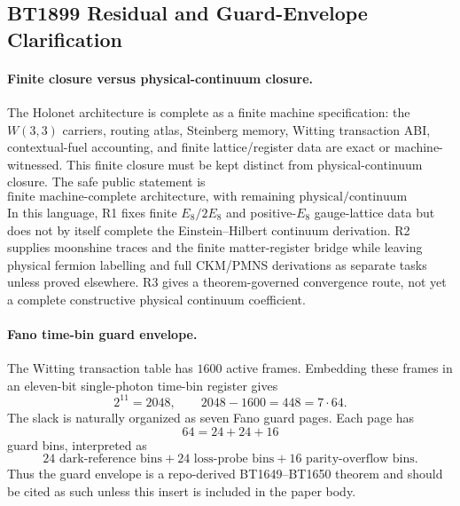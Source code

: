 
\subsection*{BT1899 Residual and Guard-Envelope Clarification}

\paragraph{Finite closure versus physical-continuum closure.}
The Holonet architecture is complete as a finite machine specification: the $W(3,3)$ carriers,
routing atlas, Steinberg memory, Witting transaction ABI, contextual-fuel accounting, and finite
lattice/register data are exact or machine-witnessed.  This finite closure must be kept distinct from
physical-continuum closure.  The safe public statement is
\[
\text{finite machine-complete architecture, with remaining physical/continuum identifications classified.}
\]
In this language, R1 fixes finite $E_8/2E_8$ and positive-$E_8$ gauge-lattice data but does not by
itself complete the Einstein--Hilbert continuum derivation.  R2 supplies moonshine traces and the
finite matter-register bridge while leaving physical fermion labelling and full CKM/PMNS derivations
as separate tasks unless proved elsewhere.  R3 gives a theorem-governed convergence route, not yet a
complete constructive physical continuum coefficient.

\paragraph{Fano time-bin guard envelope.}
The Witting transaction table has $1600$ active frames.  Embedding these frames in an eleven-bit
single-photon time-bin register gives
\[
2^{11}=2048,
\qquad
2048-1600=448=7\cdot64.
\]
The slack is naturally organized as seven Fano guard pages.  Each page has
\[
64=24+24+16
\]
guard bins, interpreted as
\[
24\text{ dark-reference bins}
+24\text{ loss-probe bins}
+16\text{ parity-overflow bins}.
\]
Thus the guard envelope is a repo-derived BT1649--BT1650 theorem and should be cited as such unless
this insert is included in the paper body.
